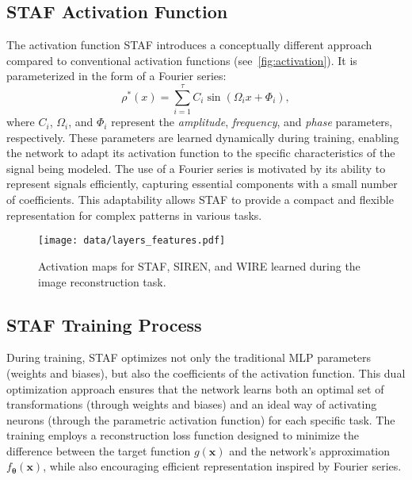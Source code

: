 \subsection{STAF Activation Function}
The activation function STAF introduces a conceptually different approach compared to conventional activation functions (see~\cref{fig:activation}). It is parameterized in the form of a Fourier series: 
\begin{equation} \label{STAF}
\rho^*(x) = \sum_{i=1}^\tau C_i \sin(\Omega_i x + \Phi_i),
\end{equation}
where \(C_i\), \(\Omega_i\), and \(\Phi_i\) represent the \textit{amplitude}, \textit{frequency}, and \textit{phase} parameters, respectively. These parameters are learned dynamically during training, enabling the network to adapt its activation function to the specific characteristics of the signal being modeled. The use of a Fourier series is motivated by its ability to represent signals efficiently, capturing essential components with a small number of coefficients. This adaptability allows STAF to provide a compact and flexible representation for complex patterns in various tasks. 

\begin{figure*}[t]
  \centering
  \texttt{[image: data/layers\_features.pdf]}
  \caption{Activation maps for STAF, SIREN, and WIRE learned during the image reconstruction task.}
  \label{fig:map}
\end{figure*}
\subsection{STAF Training Process}
During training, STAF optimizes not only the traditional MLP parameters (weights and biases), but also the coefficients of the activation function. This dual optimization approach ensures that the network learns both an optimal set of transformations (through weights and biases) and an ideal way of activating neurons (through the parametric activation function) for each specific task. The training employs a reconstruction loss function designed to minimize the difference between the target function $g(\boldsymbol{x})$ and the network's approximation $f_{\boldsymbol{\theta}}(\boldsymbol{x})$, while also encouraging efficient representation inspired by Fourier series.
